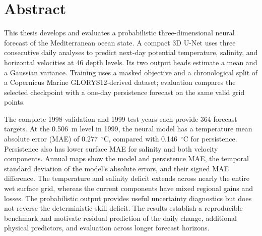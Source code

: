 \documentclass[a4paper,11pt,oneside]{book}
\begin{document}

\frontmatter
\chapter*{Abstract}
{}
This thesis develops and evaluates a probabilistic three-dimensional neural forecast of the Mediterranean ocean state. A compact 3D U-Net uses three consecutive daily analyses to predict next-day potential temperature, salinity, and horizontal velocities at 46 depth levels. Its two output heads estimate a mean and a Gaussian variance. Training uses a masked objective and a chronological split of a Copernicus Marine GLORYS12-derived dataset; evaluation compares the selected checkpoint with a one-day persistence forecast on the same valid grid points.

The complete 1998 validation and 1999 test years each provide 364 forecast targets. At the 0.506~m level in 1999, the neural model has a temperature mean absolute error (MAE) of 0.277~$^{\circ}$C, compared with 0.146~$^{\circ}$C for persistence. Persistence also has lower surface MAE for salinity and both velocity components. Annual maps show the model and persistence MAE, the temporal standard deviation of the model's absolute errors, and their signed MAE difference. The temperature and salinity deficit extends across nearly the entire wet surface grid, whereas the current components have mixed regional gains and losses. The probabilistic output provides useful uncertainty diagnostics but does not reverse the deterministic skill deficit. The results establish a reproducible benchmark and motivate residual prediction of the daily change, additional physical predictors, and evaluation across longer forecast horizons.

\tableofcontents
\listoffigures
\listoftables
\mainmatter





\backmatter
\clearpage
{}
{}


\end{document}
